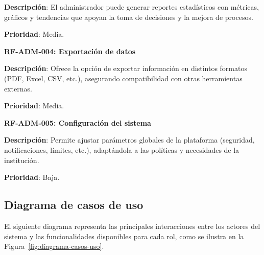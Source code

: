 \documentclass[12pt,a4paper,oneside]{report}
\begin{document}
\textbf{Descripción}: El administrador puede generar reportes estadísticos con métricas, gráficos y tendencias que apoyan la toma de decisiones y la mejora de procesos.

\textbf{Prioridad}: Media.

\textbf{RF-ADM-004: Exportación de datos}

\textbf{Descripción}: Ofrece la opción de exportar información en distintos formatos (PDF, Excel, CSV, etc.), asegurando compatibilidad con otras herramientas externas.

\textbf{Prioridad}: Media.

\textbf{RF-ADM-005: Configuración del sistema}

\textbf{Descripción}: Permite ajustar parámetros globales de la plataforma (seguridad, notificaciones, límites, etc.), adaptándola a las políticas y necesidades de la institución.

\textbf{Prioridad}: Baja.

\subsection{Diagrama de casos de uso}\label{diagrama-de-casos-de-uso}

El siguiente diagrama representa las principales interacciones entre los
actores del sistema y las funcionalidades disponibles para cada rol, como se ilustra en la Figura~\ref{fig:diagrama-casos-uso}.
\end{document}
